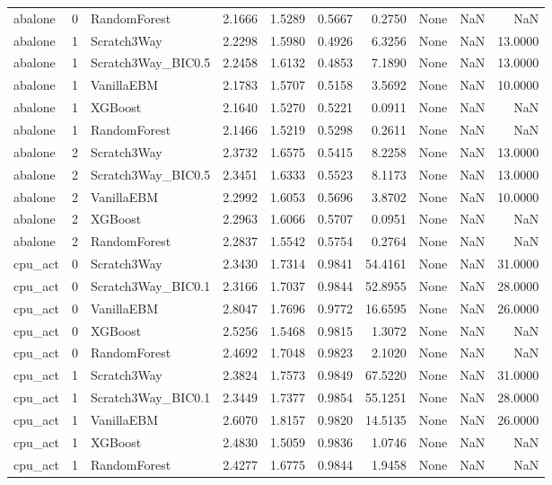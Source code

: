 \begin{tabular}{lrlrrrrlrr}
abalone & 0 & RandomForest & 2.1666 & 1.5289 & 0.5667 & 0.2750 & None & NaN & NaN \\
abalone & 1 & Scratch3Way & 2.2298 & 1.5980 & 0.4926 & 6.3256 & None & NaN & 13.0000 \\
abalone & 1 & Scratch3Way_BIC0.5 & 2.2458 & 1.6132 & 0.4853 & 7.1890 & None & NaN & 13.0000 \\
abalone & 1 & VanillaEBM & 2.1783 & 1.5707 & 0.5158 & 3.5692 & None & NaN & 10.0000 \\
abalone & 1 & XGBoost & 2.1640 & 1.5270 & 0.5221 & 0.0911 & None & NaN & NaN \\
abalone & 1 & RandomForest & 2.1466 & 1.5219 & 0.5298 & 0.2611 & None & NaN & NaN \\
abalone & 2 & Scratch3Way & 2.3732 & 1.6575 & 0.5415 & 8.2258 & None & NaN & 13.0000 \\
abalone & 2 & Scratch3Way_BIC0.5 & 2.3451 & 1.6333 & 0.5523 & 8.1173 & None & NaN & 13.0000 \\
abalone & 2 & VanillaEBM & 2.2992 & 1.6053 & 0.5696 & 3.8702 & None & NaN & 10.0000 \\
abalone & 2 & XGBoost & 2.2963 & 1.6066 & 0.5707 & 0.0951 & None & NaN & NaN \\
abalone & 2 & RandomForest & 2.2837 & 1.5542 & 0.5754 & 0.2764 & None & NaN & NaN \\
cpu_act & 0 & Scratch3Way & 2.3430 & 1.7314 & 0.9841 & 54.4161 & None & NaN & 31.0000 \\
cpu_act & 0 & Scratch3Way_BIC0.1 & 2.3166 & 1.7037 & 0.9844 & 52.8955 & None & NaN & 28.0000 \\
cpu_act & 0 & VanillaEBM & 2.8047 & 1.7696 & 0.9772 & 16.6595 & None & NaN & 26.0000 \\
cpu_act & 0 & XGBoost & 2.5256 & 1.5468 & 0.9815 & 1.3072 & None & NaN & NaN \\
cpu_act & 0 & RandomForest & 2.4692 & 1.7048 & 0.9823 & 2.1020 & None & NaN & NaN \\
cpu_act & 1 & Scratch3Way & 2.3824 & 1.7573 & 0.9849 & 67.5220 & None & NaN & 31.0000 \\
cpu_act & 1 & Scratch3Way_BIC0.1 & 2.3449 & 1.7377 & 0.9854 & 55.1251 & None & NaN & 28.0000 \\
cpu_act & 1 & VanillaEBM & 2.6070 & 1.8157 & 0.9820 & 14.5135 & None & NaN & 26.0000 \\
cpu_act & 1 & XGBoost & 2.4830 & 1.5059 & 0.9836 & 1.0746 & None & NaN & NaN \\
cpu_act & 1 & RandomForest & 2.4277 & 1.6775 & 0.9844 & 1.9458 & None & NaN & NaN \\

\end{tabular}
